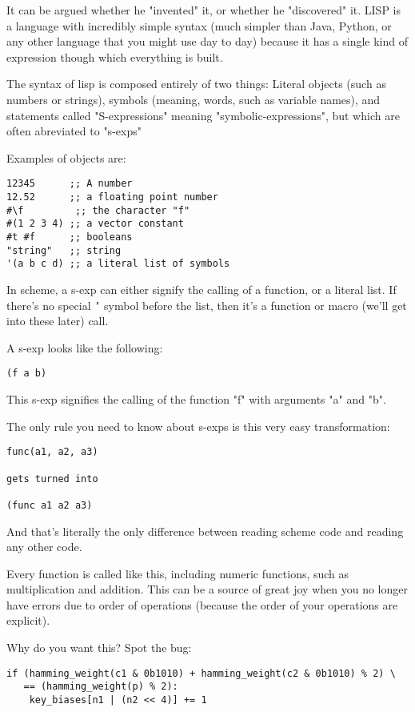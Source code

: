 \documentclass[11pt]{article}
\begin{document}
It can be argued whether he "invented" it, or whether he
"discovered" it. LISP is a language with incredibly simple syntax
(much simpler than Java, Python, or any other language that you
might use day to day) because it has a single kind of expression
though which everything is built.

The syntax of lisp is composed entirely of two things: Literal
objects (such as numbers or strings), symbols (meaning, words, such
as variable names), and statements called "S-expressions" meaning
"symbolic-expressions", but which are often abreviated to "s-exps"

Examples of objects are:
\begin{verbatim}
12345      ;; A number
12.52      ;; a floating point number
#\f         ;; the character "f"
#(1 2 3 4) ;; a vector constant
#t #f      ;; booleans
"string"   ;; string
'(a b c d) ;; a literal list of symbols
\end{verbatim}

In scheme, a s-exp can either signify the calling of a function, or
a literal list. If there's no special \texttt{'} symbol before the list,
then it's a function or macro (we'll get into these later) call.

A s-exp looks like the following:
\begin{verbatim}
(f a b)
\end{verbatim}
This s-exp signifies the calling of the function "f" with arguments
"a" and "b".

The only rule you need to know about s-exps is this very easy
transformation:
\begin{verbatim}
func(a1, a2, a3)

gets turned into

(func a1 a2 a3)
\end{verbatim}
And that's literally the only difference between reading scheme
code and reading any other code.

Every function is called like this, including numeric functions,
such as multiplication and addition. This can be a source of great
joy when you no longer have errors due to order of operations
(because the order of your operations are explicit).

Why do you want this? Spot the bug:
\begin{verbatim}
if (hamming_weight(c1 & 0b1010) + hamming_weight(c2 & 0b1010) % 2) \
   == (hamming_weight(p) % 2):
    key_biases[n1 | (n2 << 4)] += 1 
\end{verbatim}
\end{document}
